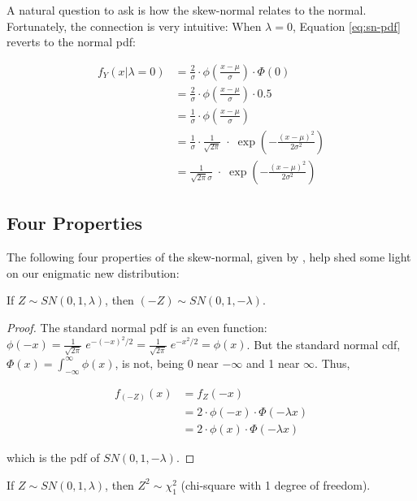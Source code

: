 \documentclass{article}
\begin{document}
A natural question to ask is how the skew-normal relates to the normal.
Fortunately, the connection is very intuitive: When $\lambda = 0$, Equation
\eqref{eq:sn-pdf} reverts to the normal pdf:

\begin{align*}
  f_Y(x|\lambda=0) &= \frac2\sigma \cdot \phi \left( \frac{x-\mu}{\sigma} \right) \cdot \Phi(0) \\
  &= \frac2\sigma \cdot \phi \left( \frac{x-\mu}{\sigma} \right) \cdot 0.5 \\
  &= \frac1\sigma \cdot \phi \left( \frac{x-\mu}{\sigma} \right) \\
  &= \frac1\sigma \cdot \frac{1}{\sqrt{2\pi}} \;\cdot\; \exp \left( -\frac{(x-\mu)^2}{2\sigma^2} \right) \\
  &= \frac{1}{\sqrt{2\pi}\sigma} \;\cdot\; \exp \left( -\frac{(x-\mu)^2}{2\sigma^2} \right)
\end{align*}

\subsection{Four Properties}
\label{subsec:four-properties}

The following four properties of the skew-normal, given by \citet{main}, help
shed some light on our enigmatic new distribution:

\begin{property} \label{prop:1}
  If $Z \sim SN(0, 1, \lambda)$, then $(-Z) \sim SN(0, 1, -\lambda)$.
\end{property}

\begin{proof}
  The standard normal pdf is an even function: $\phi(-x) =
  \frac{1}{\sqrt{2\pi}}\;e^{-(-x)^2/2} = \frac{1}{\sqrt{2\pi}}\;e^{-x^2/2} =
  \phi(x)$. But the standard normal cdf, \thinspace $\Phi(x) =
  \int_{-\infty}^\infty \phi(x)$, \thinspace is not, being 0 near $-\infty$ and
  1 near $\infty$. Thus,
  
  \begin{align*}
    f_{(-Z)}(x) &= f_Z(-x) \\
    & = 2 \cdot \phi(-x) \cdot \Phi (-\lambda x) \\
    & = 2 \cdot \phi(x) \cdot \Phi (-\lambda x)
  \end{align*}

  which is the pdf of $SN(0, 1, -\lambda)$.
\end{proof}

\begin{property} \label{prop:2}
  If $Z \sim SN(0, 1, \lambda)$, then $Z^2 \sim \chi^2_1$ (chi-square with 1 degree of freedom).
\end{property}
\end{document}
